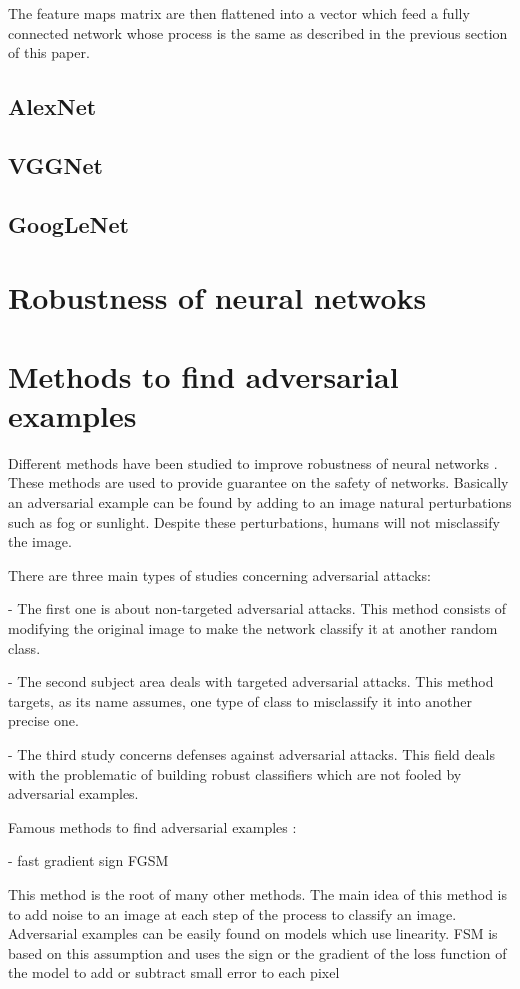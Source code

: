 The feature maps matrix are then flattened into a vector which feed a fully connected network whose process is the same as described in the previous section of this paper. 


\subsection {AlexNet}
\subsection {VGGNet}
\subsection {GoogLeNet}
\section{Robustness of neural netwoks}


\section{Methods to find adversarial examples}

Different methods have been studied to improve robustness of neural networks \cite{survey}. 
These methods are used to provide guarantee on the safety of networks. Basically an adversarial example can be found by adding to an image natural perturbations such as fog or sunlight. Despite these perturbations, humans will not misclassify the image.

There are three main types of studies concerning adversarial attacks:

- The first one is about non-targeted adversarial attacks. This method consists of modifying the original image to make the network classify it at another random class.

- The second subject area deals with targeted adversarial attacks. This method targets, as its name assumes, one type of class to misclassify it into another precise one.

- The third study concerns defenses against adversarial attacks. This field deals with the problematic of building robust classifiers which are not fooled by adversarial examples. 

Famous methods to find adversarial examples :

- fast gradient sign FGSM

This method is the root of many other methods. The main idea of this method is to add noise to an image at each step of the process to classify an image. Adversarial examples can be easily found on models which use linearity. FSM is based on this assumption and uses the sign or the gradient of the loss function of the model to add or subtract small error to each pixel

